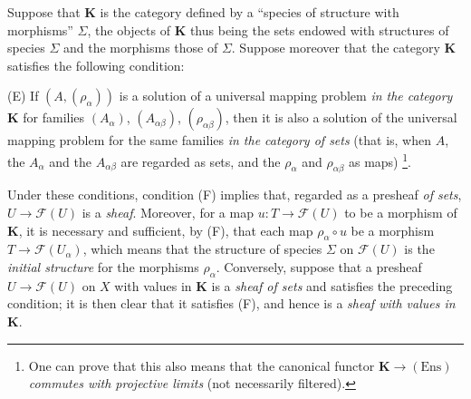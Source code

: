 \begin{env}[3.1.3]
\label{0.3.1.3}
Suppose that $\mathbf{K}$ is the category defined by a ``species of
structure with morphisms'' $\Sigma$, the objects of $\mathbf{K}$ thus being
the sets endowed with structures of species $\Sigma$ and the morphisms those of
$\Sigma$. Suppose moreover that the category $\mathbf{K}$ satisfies the
following condition:

\smallskip
\noindent
\textup{(E)} If $(A,(\rho_\alpha))$ is a solution of a universal mapping
problem \emph{in the category $\mathbf{K}$} for families
$(A_\alpha)$, $(A_{\alpha\beta})$, $(\rho_{\alpha\beta})$, then it is also
a solution of the universal mapping problem for the same families
\emph{in the category of sets} (that is, when $A$,
the $A_\alpha$ and the $A_{\alpha\beta}$ are regarded as sets, and the $\rho_\alpha$ and
$\rho_{\alpha\beta}$ as maps)%
\footnote{One can prove that this also means that the canonical functor
$\mathbf{K}\to(\mathrm{Ens})$ \emph{commutes with projective limits} (not
necessarily filtered).}.

Under these conditions, condition (F) implies that, regarded as a
presheaf \emph{of sets}, $U\to\mathcal{F}(U)$ is a \emph{sheaf}.
Moreover, for a map $u:T\to\mathcal{F}(U)$ to be a morphism of
$\mathbf{K}$, it is necessary and sufficient, by (F), that each map
$\rho_\alpha\circ u$ be a morphism $T\to\mathcal{F}(U_\alpha)$, which
means that the structure of species $\Sigma$ on $\mathcal{F}(U)$ is the
\emph{initial structure} for the morphisms $\rho_\alpha$. Conversely,
suppose that a presheaf $U\to\mathcal{F}(U)$ on $X$ with values in
$\mathbf{K}$ is a \emph{sheaf of sets} and satisfies the preceding
condition; it is then clear that it satisfies (F), and hence is a
\emph{sheaf with values in $\mathbf{K}$}.
\end{env}

